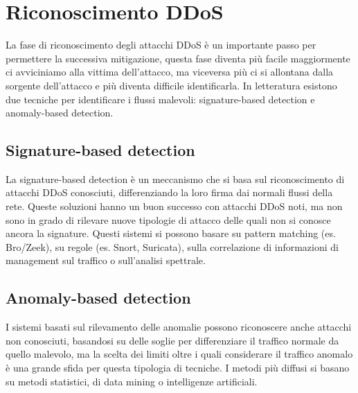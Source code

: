 



\section{Riconoscimento DDoS}

La fase di riconoscimento degli attacchi DDoS è un importante passo per permettere la successiva mitigazione, questa fase diventa più facile maggiormente ci avviciniamo alla vittima dell'attacco, ma viceversa più ci si allontana dalla sorgente dell'attacco e più diventa difficile identificarla. In letteratura esistono due tecniche per identificare i flussi malevoli: signature-based detection e anomaly-based detection.

\subsection{Signature-based detection}

La signature-based detection è un meccanismo che si basa sul riconoscimento di attacchi DDoS conosciuti, differenziando la loro firma dai normali flussi della rete. Queste soluzioni hanno un buon successo con attacchi DDoS noti, ma non sono in grado di rilevare nuove tipologie di attacco delle quali non si conosce ancora la signature. Questi sistemi si possono basare su pattern matching (es. Bro/Zeek), su regole (es. Snort, Suricata), sulla correlazione di informazioni di management sul traffico o sull'analisi spettrale.

\subsection{Anomaly-based detection}

I sistemi basati sul rilevamento delle anomalie possono riconoscere anche attacchi non conosciuti, basandosi su delle soglie per differenziare il traffico normale da quello malevolo, ma la scelta dei limiti oltre i quali considerare il traffico anomalo è una grande sfida per questa tipologia di tecniche.
I metodi più diffusi si basano su metodi statistici, di data mining o intelligenze artificiali.

